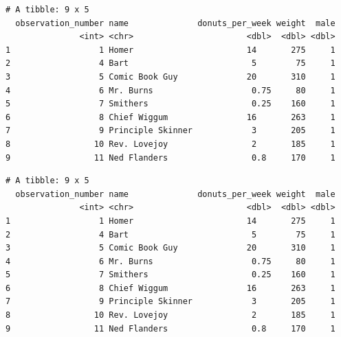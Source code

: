 \documentclass[]{book}
\newenvironment{Shaded}{\begin{snugshade}}{\end{snugshade}}
\newcommand{\CommentTok}[1]{\textcolor[rgb]{0.56,0.35,0.01}{\textit{#1}}}
\newcommand{\DecValTok}[1]{\textcolor[rgb]{0.00,0.00,0.81}{#1}}
\newcommand{\KeywordTok}[1]{\textcolor[rgb]{0.13,0.29,0.53}{\textbf{#1}}}
\newcommand{\NormalTok}[1]{#1}
\newcommand{\OperatorTok}[1]{\textcolor[rgb]{0.81,0.36,0.00}{\textbf{#1}}}
\newcommand{\StringTok}[1]{\textcolor[rgb]{0.31,0.60,0.02}{#1}}
\begin{document}
\begin{Shaded}
\end{Shaded}

\begin{verbatim}
# A tibble: 9 x 5
  observation_number name              donuts_per_week weight  male
               <int> <chr>                       <dbl>  <dbl> <dbl>
1                  1 Homer                       14       275     1
2                  4 Bart                         5        75     1
3                  5 Comic Book Guy              20       310     1
4                  6 Mr. Burns                    0.75     80     1
5                  7 Smithers                     0.25    160     1
6                  8 Chief Wiggum                16       263     1
7                  9 Principle Skinner            3       205     1
8                 10 Rev. Lovejoy                 2       185     1
9                 11 Ned Flanders                 0.8     170     1
\end{verbatim}

\begin{Shaded}
\end{Shaded}

\begin{verbatim}
# A tibble: 9 x 5
  observation_number name              donuts_per_week weight  male
               <int> <chr>                       <dbl>  <dbl> <dbl>
1                  1 Homer                       14       275     1
2                  4 Bart                         5        75     1
3                  5 Comic Book Guy              20       310     1
4                  6 Mr. Burns                    0.75     80     1
5                  7 Smithers                     0.25    160     1
6                  8 Chief Wiggum                16       263     1
7                  9 Principle Skinner            3       205     1
8                 10 Rev. Lovejoy                 2       185     1
9                 11 Ned Flanders                 0.8     170     1
\end{verbatim}
\end{document}
